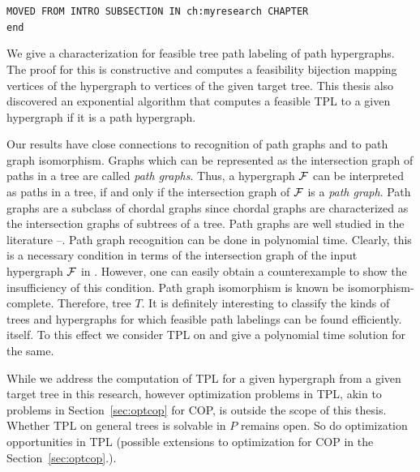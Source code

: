 \documentclass[MS]             %
              {iitmdiss_as}    %
\begin{document}
\begin{center}
{\tt MOVED FROM INTRO SUBSECTION IN ch:myresearch CHAPTER\\ end}
\end{center}

We give a characterization for feasible tree path labeling of path
hypergraphs. The proof for this is constructive and computes a
feasibility bijection mapping vertices of the hypergraph to vertices
of the given target tree. This thesis also discovered an exponential algorithm
that computes a feasible TPL to a given hypergraph if it is a path hypergraph.

Our results have close connections to recognition of path graphs and
to path graph isomorphism.  Graphs which can be represented as the
intersection graph of paths in a tree are called {\em path
  graphs}\cite{mcg04}. Thus, a hypergraph ${\cal F}$ can be interpreted as
paths in a tree, if and only if the intersection graph of ${\cal F}$ is a
{\em path graph}. Path graphs are a subclass of chordal graphs since
chordal graphs are characterized as the intersection graphs of
subtrees of a tree\cite{mcg04}.  Path graphs are well studied in the
literature \cite{plr70}--\cite{mcg04}.  Path graph recognition can be done in
polynomial time\cite{gav78,aas93}.  Clearly, this is a necessary
condition in terms of the intersection graph of the input hypergraph
${\cal F}$ in \FTPL. However, one can easily obtain a counterexample to
show the insufficiency of this condition.  Path graph isomorphism is known be
isomorphism-complete\cite{kklv10}. Therefore,  tree $T$.  It is
definitely interesting to classify the kinds of trees and hypergraphs
for which feasible path labelings can be  found
efficiently.   itself.  To this effect
we consider TPL on {\kstar} and give a polynomial time solution for
the same.


While we address the computation of TPL
for a given hypergraph%
from a given target tree in this research, however optimization
problems in TPL, akin to problems in Section~\ref{sec:optcop} for COP,
is outside the scope of this thesis. Whether TPL on general trees is
solvable in $P$ remains open. So do optimization opportunities in TPL
(possible extensions to optimization for COP in the
Section~\ref{sec:optcop}.).
\end{document}
